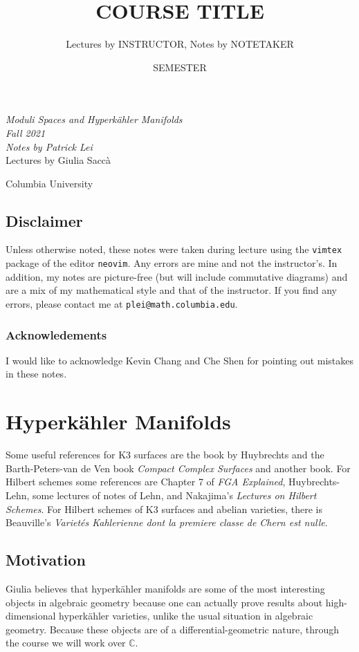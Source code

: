 \documentclass[leqno, openany]{memoir}
\title{COURSE TITLE}
\author{Lectures by INSTRUCTOR, Notes by NOTETAKER}
\date{SEMESTER}
\theoremstyle{definition}
\theoremstyle{remark}
\theoremstyle{plain}
\theoremstyle{definition}
\theoremstyle{remark}
\newcommand{\C}{\mathbb{C}}
\newcommand*{\titleSW}
    {\begingroup%
    \raggedleft
    \vspace*{\baselineskip}
    {\Huge\itshape Moduli Spaces and Hyperk\"ahler Manifolds  \\ Fall 2021}\\[\baselineskip]
    {\large\itshape Notes by Patrick Lei}\\[0.2\textheight]
    {\Large Lectures by Giulia Sacc\`a}\par
    \vfill
    {\Large \sffamily Columbia University}
    \vspace*{\baselineskip}
\endgroup}
\begin{document}
    
\begin{titlingpage}
\titleSW
\end{titlingpage}

\thispagestyle{empty}
\section*{Disclaimer}%
\label{sec:disclaimer}

Unless otherwise noted, these notes were taken during lecture using the
\texttt{vimtex} package of the editor \texttt{neovim}.  Any errors are mine and
not the instructor's.  In addition, my notes are picture-free (but will include
commutative diagrams) and are a mix of my mathematical style and that of the
instructor.  If you find any errors, please contact me at
\texttt{plei@math.columbia.edu}.

\subsection*{Acknowledements}%
\label{sub:acknowledements}

I would like to acknowledge Kevin Chang and Che Shen for pointing out mistakes in these notes.


\newpage

\tableofcontents

\chapter{Hyperk\"ahler Manifolds}%
\label{cha:introduction}

Some useful references for K3 surfaces are the book by Huybrechts and the Barth-Peters-van de Ven book \textit{Compact Complex Surfaces} and another book. For Hilbert schemes some references are Chapter 7 of \textit{FGA Explained}, Huybrechts-Lehn, some lectures of notes of Lehn, and Nakajima's \textit{Lectures on Hilbert Schemes}. For Hilbert schemes of K3 surfaces and abelian varieties, there is Beauville's \textit{Variet\'es Kahlerienne dont la premiere classe de Chern est nulle}. 

\section{Motivation}%
\label{sec:motivation}

Giulia believes that hyperk\"ahler manifolds are some of the most interesting objects in algebraic geometry because one can actually prove results about high-dimensional hyperk\"ahler varieties, unlike the usual situation in algebraic geometry. Because these objects are of a differential-geometric nature, through the course we will work over $\C$.
\end{document}
